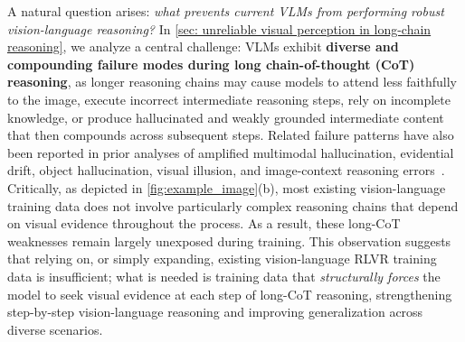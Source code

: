 A natural question arises: \emph{what prevents current VLMs from performing robust vision-language reasoning?}
In \cref{sec: unreliable visual perception in long-chain reasoning}, we analyze a central challenge:
VLMs exhibit \textbf{diverse and compounding failure modes during long chain-of-thought (CoT) reasoning}, as longer reasoning chains may cause models to attend less faithfully to the image, execute incorrect intermediate reasoning steps, rely on incomplete knowledge, or produce hallucinated and weakly grounded intermediate content that then compounds across subsequent steps.
Related failure patterns have also been reported in prior analyses of amplified multimodal hallucination, evidential drift, object hallucination, visual illusion, and image-context reasoning errors~.
Critically, as depicted in \cref{fig:example_image}(b), most existing vision-language training data does not involve particularly complex reasoning chains that depend on visual evidence throughout the process.
As a result, these long-CoT weaknesses remain largely unexposed during training.
This observation suggests that relying on, or simply expanding, existing vision-language RLVR training data is insufficient; what is needed is training data that \emph{structurally forces} the model to seek visual evidence at each step of long-CoT reasoning, strengthening step-by-step vision-language reasoning and improving generalization across diverse scenarios.


